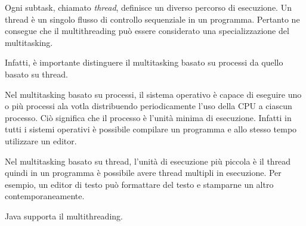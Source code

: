 \documentclass[12pt]{report}
\begin{document}
Ogni subtask, chiamato \textit{thread}, definisce un diverso percorso di esecuzione. Un thread è un singolo flusso di controllo sequenziale in un programma. Pertanto ne consegue che il multithreading può essere considerato una specializzazione del multitasking.

Infatti, è importante distinguere il multitasking basato su processi da quello basato su thread.

Nel multitasking basato su processi, il sistema operativo è capace di eseguire uno o più processi ala votla distribuendo periodicamente l'uso della CPU a ciascun processo. Ciò significa che il processo è l'unità minima di esecuzione. Infatti in tutti i sistemi operativi è possibile compilare un programma e allo stesso tempo utilizzare un editor.

Nel multitasking basato su thread, l'unità di esecuzione più piccola è il thread quindi in un programma è possibile avere thread multipli in esecuzione. Per esempio, un editor di testo può formattare del testo e stamparne un altro contemporaneamente.

Java supporta il multithreading.
\end{document}
